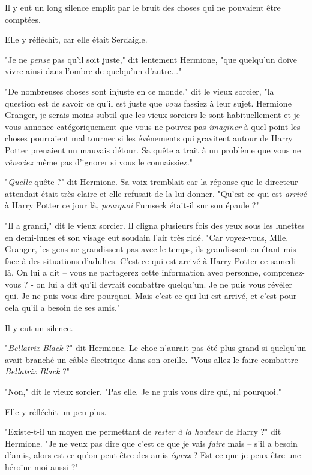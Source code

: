 Il y eut un long silence emplit par le bruit des choses qui ne pouvaient être comptées.

Elle y réfléchit, car elle était Serdaigle.

"Je ne \emph{pense}  pas qu'il soit juste," dit lentement Hermione, "que quelqu'un doive vivre ainsi dans l'ombre de quelqu'un d'autre..."

"De nombreuses choses sont injuste en ce monde," dit le vieux sorcier, "la question est de savoir ce qu'il est juste que \emph{vous}  fassiez à leur sujet. Hermione Granger, je serais moins subtil que les vieux sorciers le sont habituellement et je vous annonce catégoriquement que vous ne pouvez pas \emph{imaginer}  à quel point les choses pourraient mal tourner si les événements qui gravitent autour de Harry Potter prenaient un mauvais détour. Sa quête a trait à un problème que vous ne \emph{rêveriez}  même pas d'ignorer si vous le connaissiez."

"\emph{Quelle}  quête ?" dit Hermione. Sa voix tremblait car la réponse que le directeur attendait était très claire et elle refusait de la lui donner. "Qu'est-ce qui est \emph{arrivé}  à Harry Potter ce jour là, \emph{pourquoi}  Fumseck était-il sur son épaule ?"

"Il a grandi," dit le vieux sorcier. Il cligna plusieurs fois des yeux sous les lunettes en demi-lunes et son visage eut soudain l'air très ridé. "Car voyez-vous, Mlle. Granger, les gens ne grandissent pas avec le temps, ils grandissent en étant mis face à des situations d'adultes. C'est ce qui est arrivé à Harry Potter ce samedi-là. On lui a dit – vous ne partagerez cette information avec personne, comprenez-vous ? - on lui a dit qu'il devrait combattre quelqu'un. Je ne puis vous révéler qui. Je ne puis vous dire pourquoi. Mais c'est ce qui lui est arrivé, et c'est pour cela qu'il a besoin de ses amis."

Il y eut un silence.

"\emph{Bellatrix Black } ?" dit Hermione. Le choc n'aurait pas été plus grand si quelqu'un avait branché un câble électrique dans son oreille. "Vous allez le faire combattre \emph{Bellatrix Black } ?"

"Non," dit le vieux sorcier. "Pas elle. Je ne puis vous dire qui, ni pourquoi."

Elle y réfléchit un peu plus.

"Existe-t-il un moyen me permettant de \emph{rester à la hauteur}  de Harry ?" dit Hermione. "Je ne veux pas dire que c'est ce que je vais \emph{faire}  mais – s'il a besoin d'amis, alors est-ce qu'on peut être des amis \emph{égaux } ? Est-ce que je peux être une héroïne moi aussi ?"

